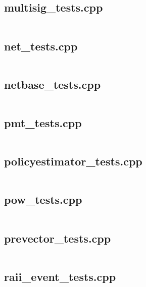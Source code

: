 \documentclass{article}
\begin{document}
\subsection{multisig\_tests.cpp}
\inputminted{cpp}{/home/dufferzafar/dev/@clones/bitcoin/src/test/multisig_tests.cpp}
\newpage

\subsection{net\_tests.cpp}
\inputminted{cpp}{/home/dufferzafar/dev/@clones/bitcoin/src/test/net_tests.cpp}
\newpage

\subsection{netbase\_tests.cpp}
\inputminted{cpp}{/home/dufferzafar/dev/@clones/bitcoin/src/test/netbase_tests.cpp}
\newpage

\subsection{pmt\_tests.cpp}
\inputminted{cpp}{/home/dufferzafar/dev/@clones/bitcoin/src/test/pmt_tests.cpp}
\newpage

\subsection{policyestimator\_tests.cpp}
\inputminted{cpp}{/home/dufferzafar/dev/@clones/bitcoin/src/test/policyestimator_tests.cpp}
\newpage

\subsection{pow\_tests.cpp}
\inputminted{cpp}{/home/dufferzafar/dev/@clones/bitcoin/src/test/pow_tests.cpp}
\newpage

\subsection{prevector\_tests.cpp}
\inputminted{cpp}{/home/dufferzafar/dev/@clones/bitcoin/src/test/prevector_tests.cpp}
\newpage

\subsection{raii\_event\_tests.cpp}
\inputminted{cpp}{/home/dufferzafar/dev/@clones/bitcoin/src/test/raii_event_tests.cpp}
\newpage
\end{document}
